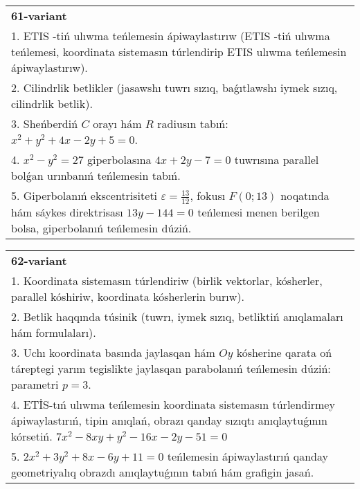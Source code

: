 \documentclass{article}
\begin{document}
\begin{tabular}{m{17cm}}
\textbf{61-variant}\\
1. ETIS -tiń ulıwma teńlemesin ápiwaylastırıw (ETIS -tiń ulıwma teńlemesi, koordinata sistemasın túrlendirip ETIS ulıwma teńlemesin ápiwaylastırıw).\\

2. Cilindrlik betlikler (jasawshı tuwrı sızıq, baǵıtlawshı iymek sızıq, cilindrlik betlik).\\

3. Sheńberdiń $C$ orayı hám $R$ radiusın tabıń: $x^2+y^2+4 x-2 y+5=0$.\\

4. $x^{2} - y^{2} = 27$ giperbolasına $4x + 2y - 7 = 0$ tuwrısına parallel bolǵan urınbanıń teńlemesin tabıń.  \\

5. Giperbolanıń ekscentrisiteti $\varepsilon = \frac{13}{12}$, fokusı $F(0;13)$ noqatında hám sáykes direktrisası $13y - 144 = 0$ teńlemesi menen berilgen bolsa, giperbolanıń teńlemesin dúziń.  
\end{tabular}
\vspace{1cm}


\begin{tabular}{m{17cm}}
\textbf{62-variant}\\
1. Koordinata sistemasın túrlendiriw (birlik vektorlar, kósherler, parallel kóshiriw, koordinata kósherlerin burıw).\\

2. Betlik haqqında túsinik (tuwrı, iymek sızıq, betliktiń anıqlamaları hám formulaları).\\

3. Uchı koordinata basında jaylasqan hám $Oy$ kósherine qarata oń táreptegi yarım tegislikte jaylasqan parabolanıń teńlemesin dúziń: parametri $p=3$.\\

4. ETİS-tıń ulıwma teńlemesin koordinata sistemasın túrlendirmey ápiwaylastırıń, tipin anıqlań, obrazı qanday sızıqtı anıqlaytuǵının kórsetiń. $7x^{2} - 8xy + y^{2} - 16x - 2y - 51 = 0$  \\

5. $2x^{2} + 3y^{2} + 8x - 6y + 11 = 0$ teńlemesin ápiwaylastırıń qanday geometriyalıq obrazdı anıqlaytuǵının tabıń hám grafigin jasań.  
\end{tabular}
\vspace{1cm}
\end{document}
